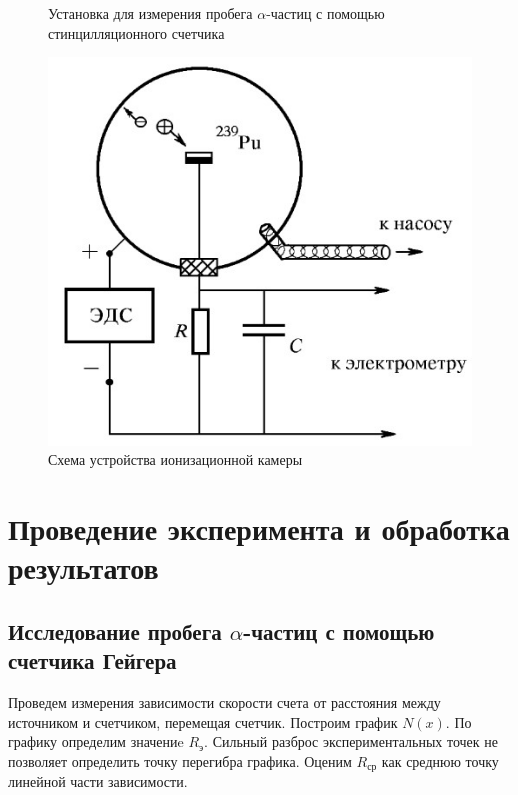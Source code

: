 \documentclass[14pt, a4paper]{report}
\begin{document}
\begin{figure}[H]
\begin{minipage}{.3\textwidth}
  \caption{Установка для измерения пробега $\alpha$-частиц с помощью стинцилляционного счетчика}
\end{minipage}%
\begin{minipage}{.3\textwidth}
  \centering
  \includegraphics[width=.9\linewidth]{../images/541-3}
  \caption{Схема устройства ионизационной камеры}
\end{minipage}
\end{figure}
\captionsetup{width=.75\textwidth}

\newpage

\section{Проведение эксперимента и обработка результатов}

\subsection{Исследование пробега $\alpha$-частиц с помощью счетчика Гейгера}

Проведем измерения зависимости скорости счета от расстояния между источником и счетчиком, перемещая счетчик. Построим график $N(x)$. По графику определим значениe $R_{э}$. Сильный разброс экспериментальных точек не позволяет определить точку перегибра графика. Оценим $R_{ср}$ как среднюю точку линейной части зависимости.
 
\end{document}
